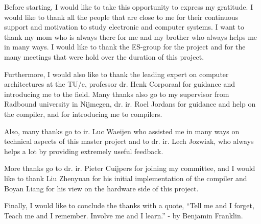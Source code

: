 Before starting, I would like to take this opportunity to express my gratitude. I would like to thank all the people that are close to me for their continuous support and motivation to study electronic and computer systems. I want to thank my mom who is always there for me and my brother who always helps me in many ways. I would like to thank the ES-group for the project and for the many meetings that were hold over the duration of this project.

Furthermore, I would also like to thank the leading expert on computer architectures at the TU/e, professor dr. Henk Corporaal for guidance and introducing me to the field. %
Many thanks also go to my supervisor from Radbound university in Nijmegen, dr. ir. Roel Jordans for guidance and help on the compiler, and for introducing me to compilers.

Also, many thanks go to ir. Luc Waeijen who assisted me in many ways on technical aspects of this master project and to dr. ir. Lech Jozwiak, who always helps a lot by providing extremely useful feedback.

More thanks go to dr. ir. Pieter Cuijpers for joining my committee, and I would like to thank Liu Zhenyuan for his initial implementation of the compiler and Boyan Liang for his view on the hardware side of this project.

Finally, I would like to conclude the thanks with a quote, ``Tell me and I forget, Teach me and I remember. Involve me and I learn.'' - by Benjamin Franklin.



